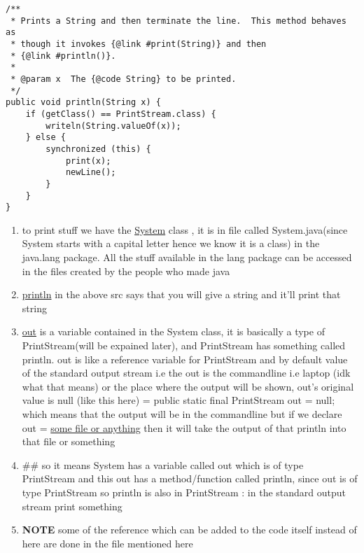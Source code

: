 \documentclass[11pt]{article}
\begin{document}
\begin{verbatim}
/**
 * Prints a String and then terminate the line.  This method behaves as
 * though it invokes {@link #print(String)} and then
 * {@link #println()}.
 *
 * @param x  The {@code String} to be printed.
 */
public void println(String x) {
    if (getClass() == PrintStream.class) {
        writeln(String.valueOf(x));
    } else {
        synchronized (this) {
            print(x);
            newLine();
        }
    }
}
\end{verbatim}

\begin{enumerate}
\item to print stuff we have the \uline{System} class , it is in file called System.java(since System starts with a capital letter hence we know it is a class) in the java.lang package. All the stuff available in the lang package can be accessed in the files created by the people who made java
\item \uline{println} in the above src says that you will give a string and it'll print that string
\item \uline{out} is a variable contained in the System class, it is basically a type of PrintStream(will be expained later), and PrintStream has something called println. out is like a reference variable for PrintStream and by default value of the standard output stream i.e the out is the commandline i.e laptop (idk what that means) or the place where the output will be shown, out's original value is null (like this here) = public static final PrintStream out = null; which means that the output will be in the commandline but if we declare out = \uline{some file or anything} then it will take the output of that println into that file or something
\item \#\# so it means System has a variable called out which is of type PrintStream and this out has a method/function called println, since out is of type PrintStream so println is also in PrintStream : in the standard output stream print something

\item \textbf{NOTE} some of the reference  which can be added to the code itself instead of here are done in the file mentioned here


\end{enumerate}
\end{document}
